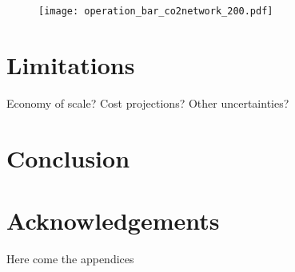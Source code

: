 \documentclass[conference]{IEEEtran}
\begin{document}
\begin{figure}
    \centering
    \texttt{[image: operation\_bar\_co2network\_200.pdf]}
\end{figure}


\section{Limitations}
\label{sec:limitations}
Economy of scale? Cost projections? Other uncertainties?

\section{Conclusion}
\label{sec:conclusion}

\section*{Acknowledgements}
\label{sec:acknowledgements}


\newpage

\printbibliography

\appendix

Here come the appendices
\end{document}

